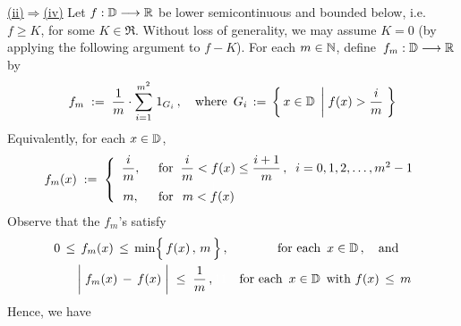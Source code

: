 \vskip 0.5cm \noindent
\underline{(ii)\;$\Longrightarrow$\;(iv)}
\vskip 0.2cm \noindent
Let $f : \mathbb{D} \longrightarrow \mathbb{R}$ be lower semicontinuous and bounded below,
i.e. $f \geq K$, for some $K \in \Re$.
Without loss of generality, we may assume $K = 0$ (by applying the following argument to $f - K$).
For each $m \in \mathbb{N}$, define \,$f_{m} : \mathbb{D} \longrightarrow \mathbb{R}$ by
\begin{equation*}
f_{m} \; := \; \dfrac{1}{m} \cdot \overset{m^{2}}{\underset{i=1}{\sum}} \; 1_{G_{i}}\,,
\quad
\textnormal{where \,$G_{i} \,:=\, \left\{\,x\in\mathbb{D}\;\left\vert\; f(x) > \dfrac{i}{m}\right.\,\right\}$}
\end{equation*}
Equivalently, for each $x \in \mathbb{D}$,
\begin{equation*}
f_{m}(x) \; := \;
\left\{\begin{array}{cl}
\dfrac{i}{m}, & \;\;\textnormal{for}\;\; \dfrac{i}{m} < f(x) \leq \dfrac{i+1}{m}\,, \;\;\textnormal{$i = 0, 1, 2, \ldots, m^{2}-1$}
\\
m, & \;\;\textnormal{for} \;\;\, m < \overset{{\color{white}\vert}}{f}(x)
\end{array}\right.
\end{equation*}
Observe that the $f_{m}$'s satisfy
\begin{eqnarray*}
0 \,\leq\, f_{m}(x) \,\leq\, \min\!\left\{\,\overset{{\color{white}.}}{f}(x)\,,\,m\,\right\},
&& \textnormal{for each \,$x \in \D$}\,,
\quad\textnormal{and}\quad
\\
\left\vert\;f_{m}(x)\,\overset{{\color{white}-}}{-}\,f(x)\;\right\vert \;\leq\; \dfrac{1}{m}\,,{\color{white}11}
&& \textnormal{for each \,$x \in \D$\, with $f(x) \,\leq\, m$}
\end{eqnarray*}
Hence, we have
